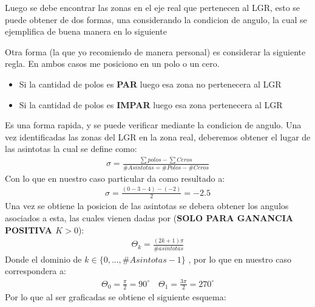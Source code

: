 \documentclass[
  11pt,
  letterpaper,
   addpoints,
   answers
  ]{exam}
\begin{document}
\begin{questions}
\begin{solution}

Luego se debe encontrar las zonas en el eje real que pertenecen al LGR, esto se puede obtener de dos formas, una considerando la condicion de angulo, la cual se ejemplifica de buena manera en lo siguiente

Otra forma (la que yo recomiendo de manera personal) es considerar la siguiente regla. En ambos casos me posiciono en un polo o un cero.
\begin{itemize}
    \item Si la cantidad de polos es \textbf{PAR} luego esa zona no pertenecera al LGR
    \item Si la cantidad de polos es \textbf{IMPAR} luego esa zona pertenecera al LGR
\end{itemize}
Es una forma rapida, y se puede verificar mediante la condicion de angulo. Una vez identificadas las zonas del LGR en la zona real, deberemos obtener el lugar de las asintotas la cual se define como:
\begin{align}
    \sigma = \frac{\sum polos - \sum Ceros}{ \# Asintotas = \# Polos - \# Ceros}
\end{align}
Con lo que en nuestro caso particular da como resultado a:
\begin{align}
    \sigma = \frac{(0-3-4 )-(-2)}{2} = -2.5
\end{align}
Una vez se obtiene la posicion de las asintotas se debera obtener los angulos asociados a esta, las cuales vienen dadas por (\textbf{SOLO PARA GANANCIA POSITIVA $K>0$}):
\begin{align}
    \Theta_{k} = \frac{(2k+1)\pi}{\#asintotas}
\end{align}
Donde el dominio de $k \in \{0,...,\#Asintotas -1 \}$ , por lo que en nuestro caso correspondera a:
\begin{align}
    \Theta_{0} = \frac{\pi}{2} = 90^{\circ} \quad \Theta_{1} = \frac{3\pi}{2}= 270^{\circ}
\end{align}
Por lo que al ser graficadas se obtiene el siguiente esquema:



\end{solution}
\end{questions}
\end{document}
